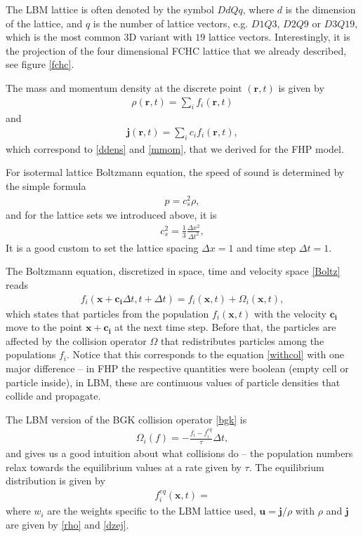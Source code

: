 The LBM lattice is often denoted by the symbol $DdQq$, where $d$ is the dimension of the lattice, and $q$ is the number of lattice vectors, e.g. $D1Q3$, $D2Q9$ or $D3Q19$, which is the most common 3D variant with $19$ lattice vectors. Interestingly, it is the projection of the four dimensional FCHC lattice that we already described, see figure \ref{fchc}.

The mass and momentum density at the discrete point $(\bm{r},t)$ is given by
\begin{align} \label{rho}
\rho(\bm{r},t) = \sum_i f_i(\bm{r},t)
\end{align}
and
\begin{align} \label{dzej}
\bm{j}(\bm{r},t) = \sum_i c_i f_i(\bm{r},t),
\end{align}
which correspond to \ref{ddens} and \ref{mmom}, that we derived for the FHP model.

For isotermal lattice Boltzmann equation, the speed of sound is determined by the simple formula
\begin{align*}
p = c_s^2 \rho,
\end{align*}
and for the lattice sets we introduced above, it is
\begin{align*}
c_s^2 = \frac{1}{3} \frac{\Delta x^2}{\Delta t^2},
\end{align*}
It is a good custom to set the lattice spacing $\Delta x = 1$  and time step $\Delta t = 1$.

The Boltzmann equation, discretized in space, time and velocity space \ref{Boltz} reads
\begin{align} \label{updt}
f_i(\bm{x} + \bm{c_i}\Delta t, t + \Delta t) = f_i(\bm{x},t) + \Omega_i(\bm{x},t),
\end{align}
which states that particles from the population $f_i(\bm{x},t)$ with the velocity $\bm{c_i}$ move to the point $\bm{x + c_i}$ at the next time step. Before that, the particles are affected by the collision operator $\Omega$ that redistributes particles among the populations $f_i$.
Notice that this corresponds to the equation \ref{withcol} with one major difference -- in FHP the respective quantities were boolean (empty cell or particle inside), in LBM, these are continuous values of particle densities that collide and propagate.

The LBM version of the BGK collision operator \ref{bgk} is
\begin{align*}
\Omega_i(f) = - \frac{f_i - f_i^{eq}}{\tau} \Delta t,
\end{align*}
and gives us a good intuition about what collisions do -- the population numbers relax towards the equilibrium values at a rate given by $\tau$.
The equilibrium distribution is given by
\begin{align} \label{mbcomp}
f_i^{eq}(\bm{x},t) = 
\end{align}
where $w_i$ are the weights specific to the LBM lattice used, $\bm{u} = \bm{j} / \rho$ with $\rho$ and $\bm{j}$ are given by \ref{rho} and \ref{dzej}.

